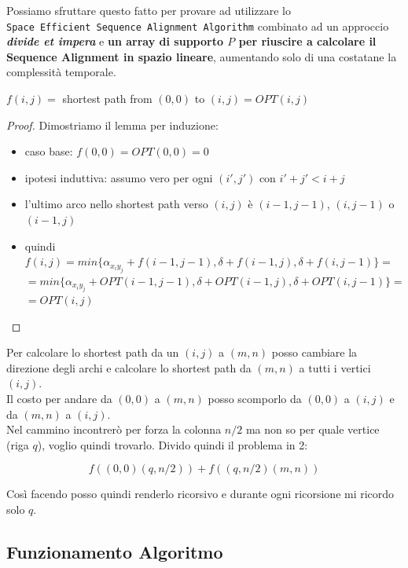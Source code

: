 Possiamo sfruttare questo fatto per provare ad utilizzare lo
\texttt{Space\ Efficient\ Sequence\ Alignment\ Algorithm} combinato ad
un approccio \emph{\textbf{divide et impera}} e \textbf{un array di
  supporto $P$ per riuscire a calcolare il Sequence Alignment in spazio
  lineare}, aumentando solo di una costatane la complessità temporale.

\begin{lemma}
  $f(i,j) =$ shortest path from $(0,0)$ to
  $(i,j) = OPT(i,j)$
\end{lemma}
\begin{proof}
  Dimostriamo il lemma per induzione:

  \begin{itemize}
    \item caso base:
          $f(0,0) = OPT(0,0) = 0$
    \item ipotesi induttiva: assumo vero per ogni
          $(i', j')$ con $i'+j' < i+j$
    \item l'ultimo arco nello shortest path
          verso $(i,j)$ è $(i-1, j-1)$, $(i, j-1)$ o $(i-1, j)$
    \item quindi
          $f(i,j) = min\{ \alpha_{x_i y_j} + f(i-1, j-1), \delta + f(i-1, j), \delta +f(i, j-1)\} =$
          $= min\{ \alpha_{x_i y_j} + OPT(i-1, j-1), \delta + OPT(i-1, j), \delta + OPT(i, j-1)\} =$
          $= OPT(i,j)$
  \end{itemize}
\end{proof}

Per calcolare lo shortest path da un $(i,j)$ a $(m,n)$ posso
cambiare la direzione degli archi e calcolare lo shortest path da
$(m,n)$ a tutti i vertici $(i,j)$.\\
Il costo per andare da $(0,0)$ a $(m,n)$ posso scomporlo da
$(0,0)$ a $(i,j)$ e da $(m,n)$ a $(i,j)$.\\
Nel cammino incontrerò per forza la colonna $n/2$ ma non so per quale
vertice (riga $q$), voglio quindi trovarlo.
Divido quindi il problema in 2:

$$
  f((0,0)(q,n/2)) + f((q,n/2)(m,n))
$$

Così facendo posso quindi renderlo ricorsivo e durante
ogni ricorsione mi ricordo solo $q$.

\subsection{Funzionamento Algoritmo}

